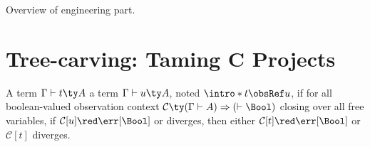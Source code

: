 Overview of engineering part.

\chapter{Tree-carving: Taming C Projects}
\label{chap:tree-carver}

\begin{definition}
\label{def:obsref}
  A term $\Gamma \vdash t \ty A$  a term
  $\Gamma \vdash u \ty A$, noted $\intro* t \obsRef u$, if for all boolean-valued observation context
  $\mathcal{C} \ty (\Gamma \vdash A) \Rightarrow (\vdash \Bool)$ closing over all
  free variables, if $\mathcal{C}[u] \red \err[\Bool]$ or diverges,
  then either $\mathcal{C}[t] \red \err[\Bool]$ or $\mathcal{C}[t]$ diverges.
\end{definition}

